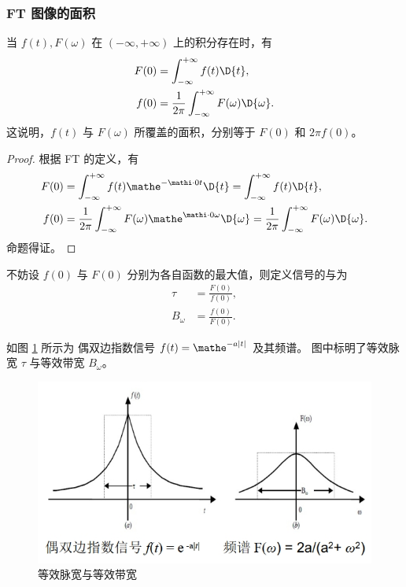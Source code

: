 \subsubsection{FT 图像的面积}

\begin{property}
    当 $f(t), F(\omega)$ 在 $(-\infty, +\infty)$ 上的积分存在时，有
    \begin{align*}
        F(0) & = \int_{-\infty}^{+\infty} f(t)\D{t}, \\
        f(0) & = \frac{1}{2\pi}\int_{-\infty}^{+\infty} F(\omega)\D{\omega}.
    \end{align*}
    这说明，$f(t)$ 与 $F(\omega)$ 所覆盖的面积，分别等于 $F(0)$ 和 $2\pi f(0)$。
\end{property}

\begin{proof}
    根据 FT 的定义，有
    \begin{align*}
        F(0) & = \int_{-\infty}^{+\infty} f(t)\mathe^{-\mathi\cdot 0 t}\D{t} = \int_{-\infty}^{+\infty} f(t)\D{t}, \\
        f(0) & = \frac{1}{2\pi}\int_{-\infty}^{+\infty} F(\omega)\mathe^{\mathi\cdot 0 \omega}\D{\omega} = \frac{1}{2\pi}\int_{-\infty}^{+\infty} F(\omega)\D{\omega}.
    \end{align*}
    命题得证。
\end{proof}

\begin{definition}[等效脉宽与等效带宽]
    不妨设 $f(0)$ 与 $F(0)$ 分别为各自函数的最大值，则定义信号的与为
    \begin{align*}
        \tau & = \frac{F(0)}{f(0)}, \\
        B_\omega & = \frac{f(0)}{F(0)}.
    \end{align*}
\end{definition}

\begin{example}
    如图 \ref{fig:equivalent-bandwidth-and-pulse-width} 所示为
    偶双边指数信号 $f(t) = \mathe^{-a|t|}$ 及其频谱。
    图中标明了等效脉宽 $\tau$ 与等效带宽 $B_\omega$。
    \begin{figure}[H]
        \centering
        \includegraphics[width = 0.6\linewidth]{chap2/img/equivalent-bandwidth-and-pulse-width.png}
        \caption{等效脉宽与等效带宽}
        \label{fig:equivalent-bandwidth-and-pulse-width}
    \end{figure}
\end{example}

